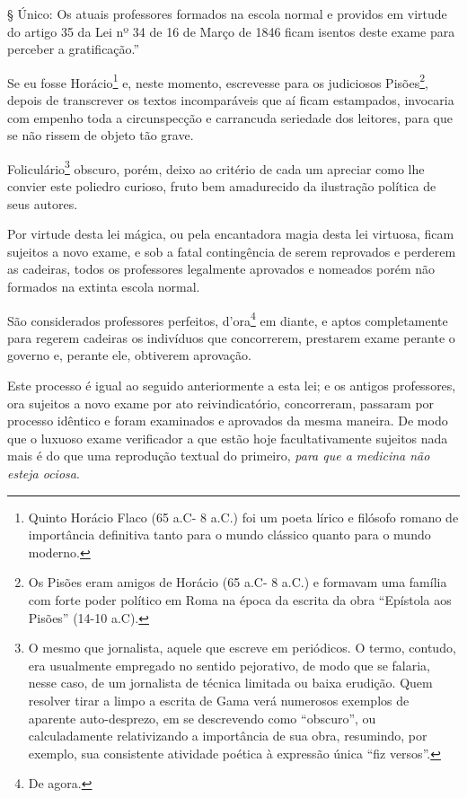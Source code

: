 § Único: Os atuais professores formados na escola normal e providos em
virtude do artigo 35 da Lei nº 34 de 16 de Março de 1846 ficam isentos
deste exame para perceber a gratificação.''

Se eu fosse Horácio\footnote{Quinto Horácio Flaco (65 a.C- 8 a.C.) foi
  um poeta lírico e filósofo romano de importância definitiva tanto para
  o mundo clássico quanto para o mundo moderno.} e, neste momento,
escrevesse para os judiciosos Pisões\footnote{Os Pisões eram amigos de
  Horácio (65 a.C- 8 a.C.) e formavam uma família com forte poder
  político em Roma na época da escrita da obra ``Epístola aos Pisões''
  (14-10 a.C).}, depois de transcrever os textos incomparáveis que aí
ficam estampados, invocaria com empenho toda a circunspecção e
carrancuda seriedade dos leitores, para que se não rissem de objeto tão
grave.

Foliculário\footnote{O mesmo que jornalista, aquele que escreve em
  periódicos. O termo, contudo, era usualmente empregado no sentido
  pejorativo, de modo que se falaria, nesse caso, de um jornalista de
  técnica limitada ou baixa erudição. Quem resolver tirar a limpo a
  escrita de Gama verá numerosos exemplos de aparente auto-desprezo, em
  se descrevendo como ``obscuro'', ou calculadamente relativizando a
  importância de sua obra, resumindo, por exemplo, sua consistente
  atividade poética à expressão única ``fiz versos''.} obscuro, porém,
deixo ao critério de cada um apreciar como lhe convier este poliedro
curioso, fruto bem amadurecido da ilustração política de seus autores.

Por virtude desta lei mágica, ou pela encantadora magia desta lei
virtuosa, ficam sujeitos a novo exame, e sob a fatal contingência de
serem reprovados e perderem as cadeiras, todos os professores legalmente
aprovados e nomeados porém não formados na extinta escola normal.

São considerados professores perfeitos, d'ora\footnote{De agora.} em
diante, e aptos completamente para regerem cadeiras os indivíduos que
concorrerem, prestarem exame perante o governo e, perante ele, obtiverem
aprovação.

Este processo é igual ao seguido anteriormente a esta lei; e os antigos
professores, ora sujeitos a novo exame por ato reivindicatório,
concorreram, passaram por processo idêntico e foram examinados e
aprovados da mesma maneira. De modo que o luxuoso exame verificador a
que estão hoje facultativamente sujeitos nada mais é do que uma
reprodução textual do primeiro, \emph{para que a medicina não esteja
ociosa}.

